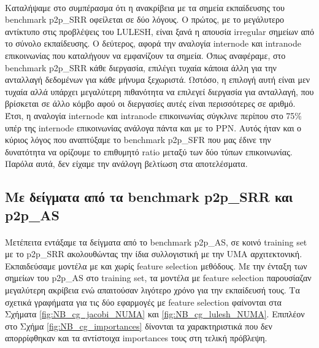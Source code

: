 \paragraph{} 
Καταλήψαμε στο συμπέρασμα ότι η ανακρίβεια με τα σημεία εκπαίδευσης του bench\-mark p2p\_SRR οφείλεται σε δύο λόγους. Ο πρώτος, με το μεγάλυτερο αντίκτυπο στις προβλέψεις του LULESH, είναι ξανά η απουσία irregular σημείων από το σύνολο εκπαίδευσης. Ο δεύτερος, αφορά την αναλογία internode και intranode επικοινωνίας που καταλήγουν να εμφανίζουν τα σημεία. Όπως αναφέραμε, στο benchmark p2p\_SRR κάθε διεργασία, επιλέγει τυχαία κάποια άλλη για την ανταλλαγή δεδομένων για κάθε μήνυμα ξεχωριστά. Ωστόσο, η επιλογή αυτή είναι μεν τυχαία αλλά υπάρχει μεγαλύτερη πιθανότητα να επιλεγεί διεργασία για ανταλλαγή, που βρίσκεται σε άλλο κόμβο αφού οι διεργασίες αυτές είναι περισσότερες σε αριθμό. Έτσι, η αναλογία internode και intranode επικοινωνίας σύγκλινε περίπου στο 75\% υπέρ της internode επικοινωνίας ανάλογα πάντα και με το PPN. Αυτός ήταν και ο κύριος λόγος που αναπτύξαμε το benchmark p2p\_SFR που μας έδινε την δυνατότητα να ορίζουμε το επιθυμητό ratio μεταξύ των δύο τύπων επικοινωνίας. Παρόλα αυτά, δεν είχαμε την ανάλογη βελτίωση στα αποτελέσματα.

\subsection{Με δείγματα από τα benchmark p2p\_SRR και p2p\_AS}
\paragraph{}
Μετέπειτα εντάξαμε τα δείγματα από το benchmark p2p\_AS, σε κοινό training set με το p2p\_SRR ακολουθώντας την ίδια συλλογιστική με την UMA αρχιτεκτονική. Εκπαιδεύσαμε μοντέλα με και χωρίς feature selection μεθόδους. Με την ένταξη των σημείων του p2p\_AS στο training set, τα μοντέλα με feature selection παρουσίαζαν μεγαλύτερη ακρίβεια ενώ απαιτούσαν λιγότερο χρόνο για την εκπαίδευσή τους. Τα σχετικά γραφήματα για τις δύο εφαρμογές με feature selection φαίνονται στα Σχήματα \ref{fig:NB_cg_jacobi_NUMA} και \ref{fig:NB_cg_lulesh_NUMA}. Επιπλέον στο Σχήμα \ref{fig:NB_cg_importances} δίνονται τα χαρακτηριστικά που δεν απορρίφθηκαν  και τα αντίστοιχα importances τους στη τελική πρόβλεψη.

